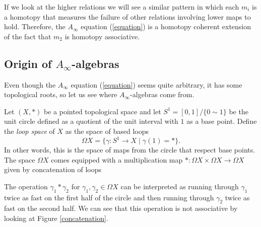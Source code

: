 \documentclass[bibtex,babel-main=english]{TEMat-article}
\begin{document}
If we look at the higher relations we will see a similar pattern in which each $m_i$ is a homotopy that measures the failure of other relations involving lower maps to hold. Therefore, the $A_\infty$ equation (\ref{equation}) is a homotopy coherent extension of the fact that $m_2$ is homotopy associative.

\subsection{Origin of $A_\infty$-algebras}

Even though the $A_\infty$ equation (\ref{equation}) seems quite arbitrary, it has some topological roots, so let us see where $A_\infty$-algebras come from.

Let $(X,*)$ be a pointed topological space and let $S^1=[0,1]/\{0\sim 1\}$ be the unit circle defined as a quotient of the unit interval with $1$ as a base point. Define the \emph{loop space} of $X$ as the space of based loops \[\Omega X =\{\gamma:S^1\to X\mid \gamma(1)=*\}.\] In other words, this is the space of maps from the circle that respect base points. The space $\Omega X$ comes equipped with a multiplication map $*:\Omega X\times\Omega X\to \Omega X$ given by concatenation of loops


The operation $\gamma_1*\gamma_2$ for $\gamma_1,\gamma_2\in\Omega X$ can be interpreted as running through $\gamma_1$ twice as fast on the first half of the circle and then running through $\gamma_2$ twice as fast on the second half. We can see that this operation is not associative by looking at Figure \ref{concatenation}.
\end{document}
